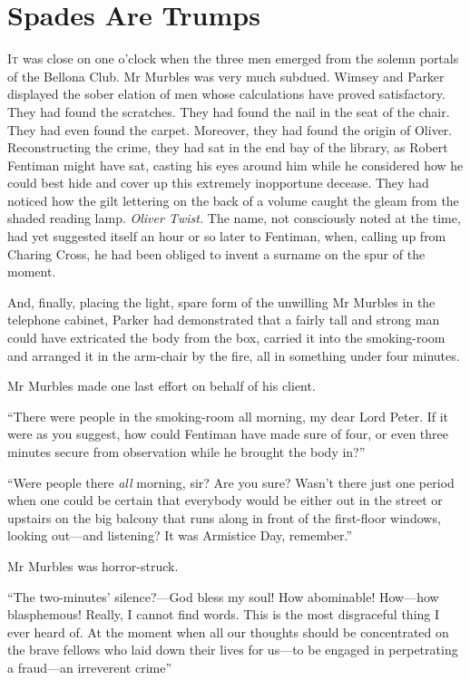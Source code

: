 \chapter{Spades Are Trumps}
\lettrine[lines=4]{I}{t} was close on one o'clock when the three men emerged from the solemn portals of the Bellona Club. Mr Murbles was very much subdued. Wimsey and Parker displayed the sober elation of men whose calculations have proved satisfactory. They had found the scratches. They had found the nail in the seat of the chair. They had even found the carpet. Moreover, they had found the origin of Oliver. Reconstructing the crime, they had sat in the end bay of the library, as Robert Fentiman might have sat, casting his eyes around him while he considered how he could best hide and cover up this extremely inopportune decease. They had noticed how the gilt lettering on the back of a volume caught the gleam from the shaded reading lamp. \textit{Oliver Twist.} The name, not consciously noted at the time, had yet suggested itself an hour or so later to Fentiman, when, calling up from Charing Cross, he had been obliged to invent a surname on the spur of the moment.

And, finally, placing the light, spare form of the unwilling Mr Murbles in the telephone cabinet, Parker had demonstrated that a fairly tall and strong man could have extricated the body from the box, carried it into the smoking-room and arranged it in the arm-chair by the fire, all in something under four minutes.

Mr Murbles made one last effort on behalf of his client.

\enquote{There were people in the smoking-room all morning, my dear Lord Peter. If it were as you suggest, how could Fentiman have made sure of four, or even three minutes secure from observation while he brought the body in?}

\enquote{Were people there \textit{all} morning, sir? Are you sure? Wasn't there just one period when one could be certain that everybody would be either out in the street or upstairs on the big balcony that runs along in front of the first-floor windows, looking out\allowbreak---\allowbreak and listening? It was Armistice Day, remember.}

Mr Murbles was horror-struck.

\enquote{The two-minutes' silence?---God bless my soul! How abominable! How\allowbreak---\allowbreak how blasphemous! Really, I cannot find words. This is the most disgraceful thing I ever heard of. At the moment when all our thoughts should be concentrated on the brave fellows who laid down their lives for us\allowbreak---\allowbreak to be engaged in perpetrating a fraud\allowbreak---\allowbreak an irreverent crime\longdash}

